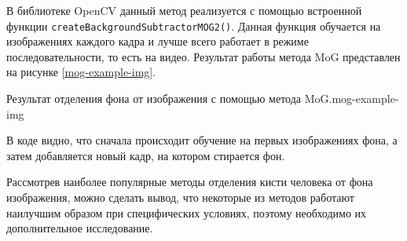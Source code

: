 В библиотеке OpenCV данный метод реализуется с помощью встроенной функции
{\tt createBackgroundSubtractorMOG2()}. Данная функция обучается на изображениях
каждого кадра и лучше всего работает в режиме последовательности, то есть на
видео. Результат работы метода MoG представлен на рисунке
\ref{mog-example-img}.

\newpage

{Результат отделения фона от изображения с помощью метода MoG.}{mog-example-img}

В коде видно, что сначала происходит обучение на первых изображениях фона, 
а затем добавляется новый кадр, на котором стирается фон.

\bigskip

Рассмотрев наиболее популярные методы отделения кисти человека от фона изображения, можно сделать
вывод, что некоторые из методов работают наилучшим образом при специфических условиях, поэтому
необходимо их дополнительное исследование. 









